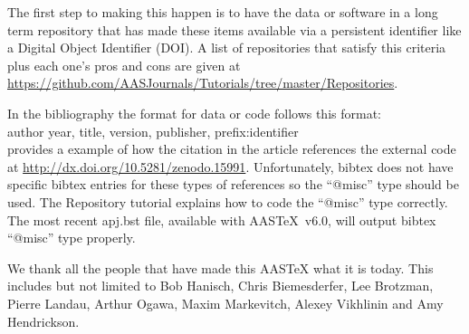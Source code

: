 \documentclass{aastex6}
\newcommand\aastex{AAS\TeX}
\begin{document}
The first step to making this happen is to have the data or software in
a long term repository that has made these items available via a persistent
identifier like a Digital Object Identifier (DOI).  A list of repositories
that satisfy this criteria plus each one's pros and cons are given at \break
\url{https://github.com/AASJournals/Tutorials/tree/master/Repositories}.

In the bibliography the format for data or code follows this format: \\

\noindent author year, title, version, publisher, prefix:identifier\\

\citet{2015ApJ...805...23C} provides a example of how the citation in the
article references the external code at
\url{http://dx.doi.org/10.5281/zenodo.15991}.  Unfortunately, bibtex does
not have specific bibtex entries for these types of references so the
``@misc'' type should be used.  The Repository tutorial explains how to code
the ``@misc'' type correctly.  The most recent apj.bst file, available with
\aastex\ v6.0, will output bibtex ``@misc'' type properly.

\acknowledgments

We thank all the people that have made this AASTeX what it is today.  This
includes but not limited to Bob Hanisch, Chris Biemesderfer, Lee Brotzman,
Pierre Landau, Arthur Ogawa, Maxim Markevitch, Alexey Vikhlinin and Amy
Hendrickson.



\vspace{5mm}


\end{document}
